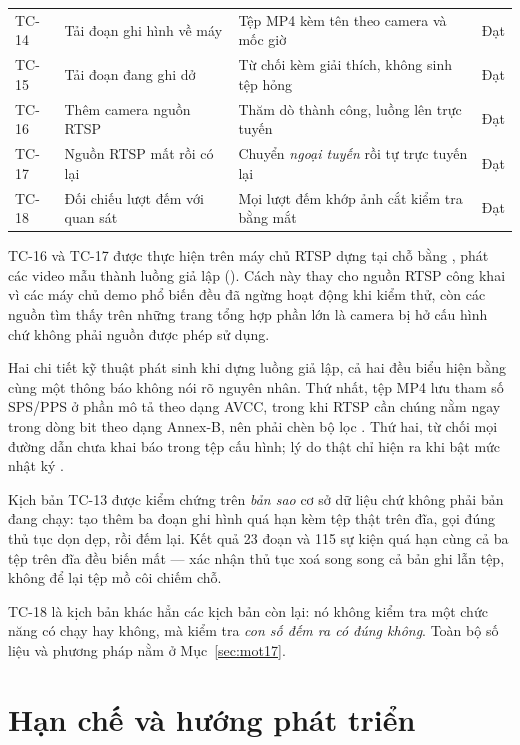 \begin{table}[H]
\begin{tabularx}{\textwidth}{@{}llXl@{}}
TC-14 & Tải đoạn ghi hình về máy & Tệp MP4 kèm tên theo camera và mốc giờ & Đạt \\
TC-15 & Tải đoạn đang ghi dở & Từ chối kèm giải thích, không sinh tệp hỏng & Đạt \\
TC-16 & Thêm camera nguồn RTSP & Thăm dò thành công, luồng lên trực tuyến & Đạt \\
TC-17 & Nguồn RTSP mất rồi có lại & Chuyển \emph{ngoại tuyến} rồi tự trực tuyến lại & Đạt \\
TC-18 & Đối chiếu lượt đếm với quan sát & Mọi lượt đếm khớp ảnh cắt kiểm tra bằng mắt & Đạt \\
\bottomrule
\end{tabularx}
\end{table}

TC-16 và TC-17 được thực hiện trên máy chủ RTSP dựng tại chỗ bằng
, phát các video mẫu thành luồng giả lập
(). Cách này thay cho nguồn RTSP công khai vì các
máy chủ demo phổ biến đều đã ngừng hoạt động khi kiểm thử, còn các nguồn tìm thấy
trên những trang tổng hợp phần lớn là camera bị hở cấu hình chứ không phải nguồn
được phép sử dụng.

Hai chi tiết kỹ thuật phát sinh khi dựng luồng giả lập, cả hai đều biểu hiện bằng
cùng một thông báo  không nói rõ nguyên nhân. Thứ nhất, tệp
MP4 lưu tham số SPS/PPS ở phần mô tả theo dạng AVCC, trong khi RTSP cần chúng nằm
ngay trong dòng bit theo dạng Annex-B, nên phải chèn bộ lọc
. Thứ hai,  từ chối mọi đường dẫn chưa khai
báo trong tệp cấu hình; lý do thật chỉ hiện ra khi bật mức nhật ký .

Kịch bản TC-13 được kiểm chứng trên \emph{bản sao} cơ sở dữ liệu chứ không phải bản
đang chạy: tạo thêm ba đoạn ghi hình quá hạn kèm tệp thật trên đĩa, gọi đúng thủ tục
dọn dẹp, rồi đếm lại. Kết quả 23 đoạn và 115 sự kiện quá hạn cùng cả ba tệp trên đĩa
đều biến mất --- xác nhận thủ tục xoá song song cả bản ghi lẫn tệp, không để lại tệp
mồ côi chiếm chỗ.

TC-18 là kịch bản khác hẳn các kịch bản còn lại: nó không kiểm tra một chức năng có
chạy hay không, mà kiểm tra \emph{con số đếm ra có đúng không}. Toàn bộ số liệu và
phương pháp nằm ở Mục~\ref{sec:mot17}.

\section{Hạn chế và hướng phát triển}
\label{sec:hanche}


